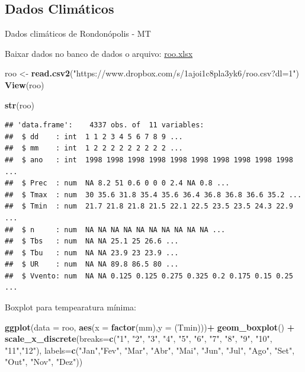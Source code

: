 \documentclass[
]{book}
\newenvironment{Shaded}{\begin{snugshade}}{\end{snugshade}}
\newcommand{\DataTypeTok}[1]{\textcolor[rgb]{0.13,0.29,0.53}{#1}}
\newcommand{\KeywordTok}[1]{\textcolor[rgb]{0.13,0.29,0.53}{\textbf{#1}}}
\newcommand{\NormalTok}[1]{#1}
\newcommand{\OperatorTok}[1]{\textcolor[rgb]{0.81,0.36,0.00}{\textbf{#1}}}
\newcommand{\StringTok}[1]{\textcolor[rgb]{0.31,0.60,0.02}{#1}}
\begin{document}
\hypertarget{dados-climuxe1ticos}{%
\subsection{Dados Climáticos}\label{dados-climuxe1ticos}}

Dados climáticos de Rondonópolis - MT

Baixar dados no banco de dados o arquivo: \href{https://www.dropbox.com/s/1ajoi1c8pla3yk6/roo.csv?dl=1}{roo.xlsx}

\begin{Shaded}
\begin{Highlighting}[]
\NormalTok{roo <-}\StringTok{ }\KeywordTok{read.csv2}\NormalTok{(}\StringTok{"https://www.dropbox.com/s/1ajoi1c8pla3yk6/roo.csv?dl=1"}\NormalTok{)}
\KeywordTok{View}\NormalTok{(roo)}

\KeywordTok{str}\NormalTok{(roo)}
\end{Highlighting}
\end{Shaded}

\begin{verbatim}
## 'data.frame':    4337 obs. of  11 variables:
##  $ dd    : int  1 1 2 3 4 5 6 7 8 9 ...
##  $ mm    : int  1 2 2 2 2 2 2 2 2 2 ...
##  $ ano   : int  1998 1998 1998 1998 1998 1998 1998 1998 1998 1998 ...
##  $ Prec  : num  NA 8.2 51 0.6 0 0 0 2.4 NA 0.8 ...
##  $ Tmax  : num  30 35.6 31.8 35.4 35.6 36.4 36.8 36.8 36.6 35.2 ...
##  $ Tmin  : num  21.7 21.8 21.8 21.5 22.1 22.5 23.5 23.5 24.3 22.9 ...
##  $ n     : num  NA NA NA NA NA NA NA NA NA NA ...
##  $ Tbs   : num  NA NA 25.1 25 26.6 ...
##  $ Tbu   : num  NA NA 23.9 23 23.9 ...
##  $ UR    : num  NA NA 89.8 86.5 80 ...
##  $ Vvento: num  NA NA 0.125 0.125 0.275 0.325 0.2 0.175 0.15 0.25 ...
\end{verbatim}

Boxplot para tempearatura mínima:

\begin{Shaded}
\begin{Highlighting}[]
\KeywordTok{ggplot}\NormalTok{(}\DataTypeTok{data =}\NormalTok{ roo, }\KeywordTok{aes}\NormalTok{(}\DataTypeTok{x =} \KeywordTok{factor}\NormalTok{(mm),}\DataTypeTok{y =}\NormalTok{ (Tmin)))}\OperatorTok{+}
\StringTok{  }\KeywordTok{geom_boxplot}\NormalTok{() }\OperatorTok{+}
\StringTok{  }\KeywordTok{scale_x_discrete}\NormalTok{(}\DataTypeTok{breaks=}\KeywordTok{c}\NormalTok{(}\StringTok{"1"}\NormalTok{, }\StringTok{"2"}\NormalTok{, }\StringTok{"3"}\NormalTok{, }\StringTok{"4"}\NormalTok{, }\StringTok{"5"}\NormalTok{, }\StringTok{"6"}\NormalTok{, }\StringTok{"7"}\NormalTok{, }\StringTok{"8"}\NormalTok{, }\StringTok{"9"}\NormalTok{, }\StringTok{"10"}\NormalTok{, }\StringTok{"11"}\NormalTok{,}\StringTok{"12"}\NormalTok{),}
            \DataTypeTok{labels=}\KeywordTok{c}\NormalTok{(}\StringTok{"Jan"}\NormalTok{,}\StringTok{"Fev"}\NormalTok{, }\StringTok{"Mar"}\NormalTok{, }\StringTok{"Abr"}\NormalTok{, }\StringTok{"Mai"}\NormalTok{, }\StringTok{"Jun"}\NormalTok{, }\StringTok{"Jul"}\NormalTok{, }\StringTok{"Ago"}\NormalTok{, }\StringTok{"Set"}\NormalTok{, }\StringTok{"Out"}\NormalTok{, }\StringTok{"Nov"}\NormalTok{, }\StringTok{"Dez"}\NormalTok{))}
\end{Highlighting}
\end{Shaded}
\end{document}

